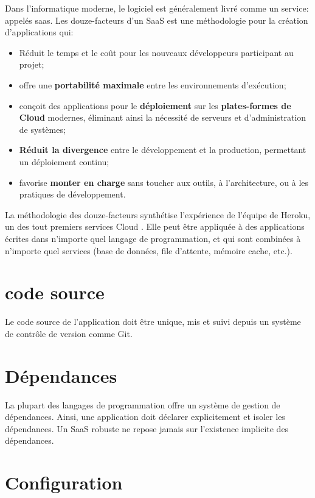 Dans l'informatique moderne, le logiciel est généralement livré comme un service: appelés \acrshort{saas}. Les douze-facteurs d'un SaaS est une méthodologie pour la création d'applications qui:

\begin{itemize}
	\item Réduit le temps et le coût pour les nouveaux développeurs participant au projet;
	\item offre une \textbf{portabilité maximale} entre les environnements d'exécution;
	\item conçoit des applications pour le \textbf{déploiement} sur les \textbf{plates-formes de Cloud} modernes, éliminant ainsi la nécessité de serveurs et d'administration de systèmes;
	\item \textbf{Réduit la divergence} entre le développement et la production, permettant un déploiement continu;
	\item favorise \textbf{monter en charge} sans toucher aux outils, à l'architecture, ou à les pratiques de développement.
\end{itemize}


La méthodologie des douze-facteurs synthétise l’expérience de l'équipe de Heroku, un des tout premiers services Cloud \cite{12-factors}. Elle peut être appliquée à des applications écrites dans n'importe quel langage de programmation, et qui sont combinées à n'importe quel services (base de données, file d'attente, mémoire cache, etc.).


\section*{code source}

Le code source de l'application doit être unique, mis et suivi depuis un système de contrôle de version comme Git.

\section*{Dépendances}

La plupart des langages de programmation offre un système de gestion de dépendances. Ainsi, une application doit déclarer explicitement et isoler les dépendances. Un SaaS robuste ne repose jamais sur l’existence implicite des dépendances. 

\section*{Configuration}

